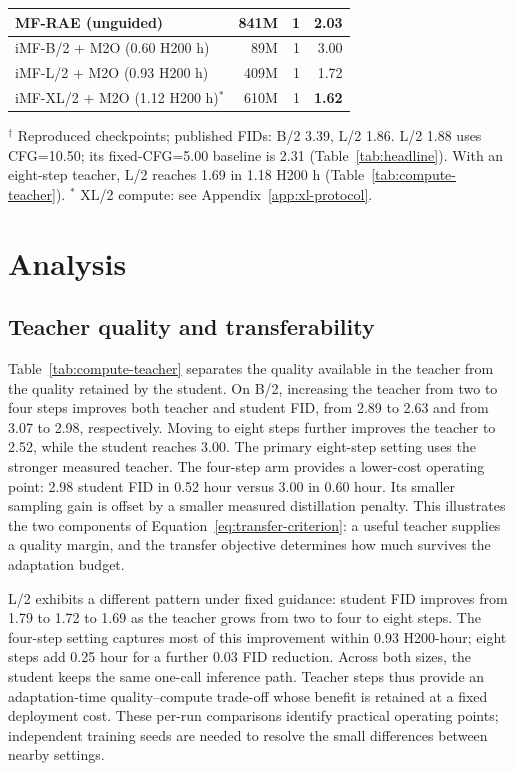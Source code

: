\documentclass{article}
\begin{document}
\begin{table}[t]
\begin{tabular}{lrrr}
MF-RAE (unguided)~\citep{hu2025mfrae} & 841M & 1 & 2.03 \\
\midrule
iMF-B/2 + M2O (0.60 H200 h) & 89M & 1 & 3.00 \\
iMF-L/2 + M2O (0.93 H200 h) & 409M & 1 & 1.72 \\
iMF-XL/2 + M2O (1.12 H200 h)$^{*}$ & 610M & 1 & \textbf{1.62} \\
\bottomrule
\end{tabular}
\label{tab:model-context}
\par\smallskip
\begin{minipage}{\linewidth}
\footnotesize
$^{\dagger}$ Reproduced checkpoints; published FIDs: B/2 3.39, L/2 1.86.
L/2 1.88 uses CFG=10.50; its fixed-CFG=5.00 baseline is 2.31
(Table~\ref{tab:headline}). With an eight-step teacher, L/2 reaches 1.69
in 1.18 H200 h (Table~\ref{tab:compute-teacher}).
$^{*}$ XL/2 compute: see Appendix~\ref{app:xl-protocol}.
\end{minipage}
\end{table}

\section{Analysis}
\label{sec:qualitative}
\subsection{Teacher quality and transferability}
Table~\ref{tab:compute-teacher} separates the quality available in the
teacher from the quality retained by the student. On B/2, increasing the
teacher from two to four steps improves both teacher and student FID,
from 2.89 to 2.63 and from 3.07 to 2.98, respectively. Moving to eight steps
further improves the teacher to 2.52, while the student reaches 3.00.
The primary eight-step setting uses the stronger measured teacher.
The four-step arm provides a lower-cost operating point: 2.98 student FID
in 0.52 hour versus 3.00 in 0.60 hour. Its smaller sampling gain is offset
by a smaller measured distillation penalty. This illustrates the two components of
Equation~\ref{eq:transfer-criterion}: a useful teacher supplies a quality
margin, and the transfer objective determines how much survives the
adaptation budget.

L/2 exhibits a different pattern under fixed guidance: student FID improves
from 1.79 to 1.72 to 1.69 as the teacher grows from two to four to eight
steps. The four-step setting captures most of this improvement within
0.93 H200-hour; eight steps add 0.25 hour for a further 0.03 FID reduction.
Across both sizes, the student keeps the same one-call inference path.
Teacher steps thus provide an adaptation-time quality--compute trade-off
whose benefit is retained at a fixed deployment cost.
These per-run comparisons identify practical operating points; independent
training seeds are needed to resolve the small differences between nearby
settings.
\end{document}
